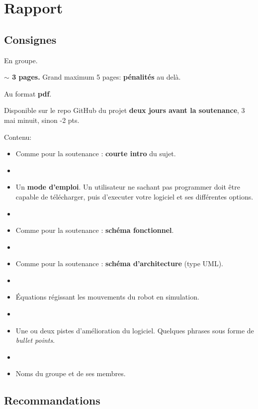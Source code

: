 \documentclass[a4paper,12pt]{article}
\begin{document}
\section{Rapport}

\subsection{Consignes}

En groupe.

\vspace{0.2cm}

\textbf{$\sim$ 3 pages.} Grand maximum 5 pages: \textbf{pénalités} au delà.

\vspace{0.2cm}

Au format \textbf{pdf}.

\vspace{0.2cm}

Disponible sur le repo GitHub du projet \textbf{deux jours avant la soutenance}, 3 mai minuit, sinon -2 pts.

\vspace{0.2cm}

Contenu:
\begin{itemize}
\item[$\ast$] Comme pour la soutenance : \textbf{courte intro} du sujet.
\item[$ $]
\item[$\ast$] Un \textbf{mode d'emploi}. Un utilisateur ne sachant pas programmer doit
être capable de télécharger, puis d'executer votre logiciel et ses différentes options.
\item[$ $]
\item[$\ast$] Comme pour la soutenance : \textbf{schéma fonctionnel}.
\item[$ $]
\item[$\ast$] Comme pour la soutenance : \textbf{schéma d'architecture} (type UML).
\item[$ $]
\item[$\ast$] Équations régissant les mouvements du robot en simulation.
\item[$ $]
\item[$\ast$] Une ou deux pistes d'amélioration du logiciel. Quelques phrases sous forme de 
\textit{bullet points}.
\item[$ $]
\item[$\ast$] Noms du groupe et de ses membres.
\end{itemize}


\subsection{Recommandations}
\end{document}
